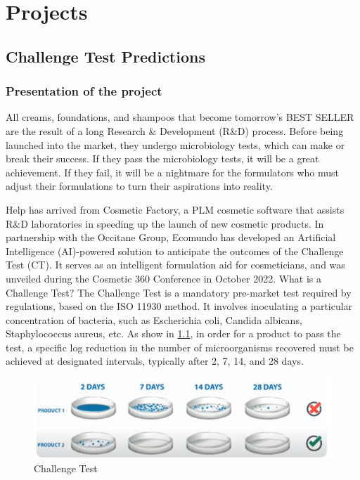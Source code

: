 \documentclass[a4paper,12pt,twoside]{report}
\begin{document}
\chapter{Projects}
\thispagestyle{empty}
\section{Challenge Test Predictions}
\subsection{Presentation of the project}
All creams, foundations, and shampoos that become tomorrow's BEST SELLER are the result of a long Research \& Development (R\&D) process. Before being launched into the market, they undergo microbiology tests, which can make or break their success. If they pass the microbiology tests, it will be a great achievement. If they fail, it will be a nightmare for the formulators who must adjust their formulations to turn their aspirations into reality.

Help has arrived from Cosmetic Factory, a PLM cosmetic software that assists R\&D laboratories in speeding up the launch of new cosmetic products. In partnership with the Occitane Group, Ecomundo has developed an Artificial Intelligence (AI)-powered solution to anticipate the outcomes of the Challenge Test (CT). It serves as an intelligent formulation aid for cosmeticians, and was unveiled during the Cosmetic 360 Conference in October 2022. 
What is a Challenge Test? The Challenge Test is a mandatory pre-market test required by regulations, based on the ISO 11930 method. It involves inoculating a particular concentration of bacteria, such as Escherichia coli, Candida albicans, Staphylococcus aureus, etc. As show in \ref{challengetest}, in order for a product to pass the test, a specific log reduction in the number of microorganisms recovered must be achieved at designated intervals, typically after 2, 7, 14, and 28 days.
\begin{figure}[H]
		\includegraphics[width=\textwidth]{images/CT}
	\caption[Challenge Test]{Challenge Test}
	\label{challengetest}
\end{figure}
\end{document}
